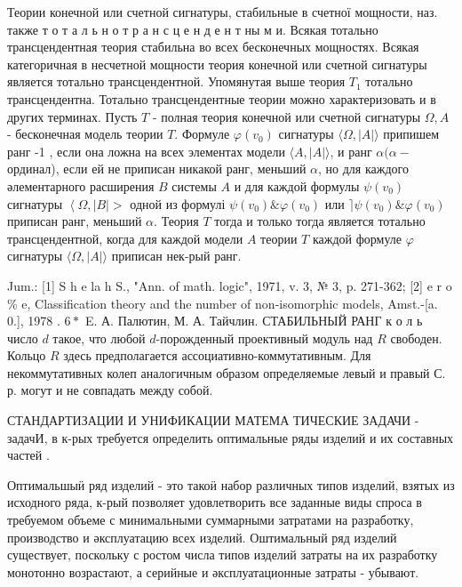 \documentclass[10pt]{article}
\begin{document}
Теории конечной или счетной сигнатуры, стабильные в счетної мощности, наз. также т о т а л ь н о т р а н с ц е н д е н т ны м и. Всякая тотально трансцендентная теория стабильна во всех бесконечных мощностях. Всякая категоричная в несчетной мощности теория конечной или счетной сигнатуры является тотально трансцендентной. Упомянутая выше теория $T_{1}$ тотально трансцендентна. Тотально трансцендентные теории можно характеризовать и в других терминах. Пусть $T$ - полная теория конечной или счетной сигнатуры $\Omega, A$ - бесконечная модель теории $T$. Формуле $\varphi\left(v_{0}\right)$ сигнатуры $\langle\Omega,|A|\rangle$ припишем ранг -1 , если она ложна на всех элементах модели $\langle A,|A|\rangle$, и ранг $\alpha(\alpha-$ ординал), если ей не приписан никакой ранг, меньший $\alpha$, но для каждого әлементарного расширения $B$ системы $A$ и для каждой формулы $\psi\left(v_{0}\right)$ сигнатуры $\left\langle\Omega,|B|>\right.$ одной из формулі $\psi\left(v_{0}\right) \& \varphi\left(v_{0}\right)$ или $\rceil \psi\left(v_{0}\right) \& \varphi\left(v_{0}\right)$ приписан ранг, меньший $\alpha$. Теория $T$ тогда и только тогда является тотально трансцендентной, когда для каждой модели $A$ теории $T$ каждой формуле $\varphi$ сигнатуры $\langle\Omega,|A|\rangle$ приписан нек-рый ранг.



Jum.: [1] S h e la h S., "Ann. of math. logic", 1971, v. 3, № 3, p. 271-362; [2] e r o \% e, Classification theory and the number of non-isomorphic models, Amst.-[a. 0.], 1978 . $6 *$ E. А. Палютин, М. А. Тайчлин. СТАБИЛЬНЫЙ РАНГ к о л ь число $d$ такое, что любой $d$-порожденный проективный модуль над $R$ свободен. Кольцо $R$ здесь предполагается ассоциативно-коммутативным. Для некоммутативных колеп аналогичным образом определяемые левый и правый С. р. могут и не совпадать между собой.



СТАНДАРТИЗАЦИИ И УНИФИКАЦИИ МАТЕМА ТИЧЕСКИЕ ЗАДАЧИ - задачИ, в к-рых требуется определить оптимальные ряды изделий и их составных частей .



Оптимальшыӥ ряд изделий - это такоӥ набор различных типов изделий, взятых из исходного ряда, к-рый позволяет удовлетворить все заданные виды спроса в требуемом объеме с минимальными суммарными затратами на разработку, производство и әксплуатацию всех изделий. Оштимальный ряд изделий существует, поскольку с ростом числа типов изделий затраты на их разработку монотонно возрастают, а серийные и әксплуатационные затраты - убывают.
\end{document}
